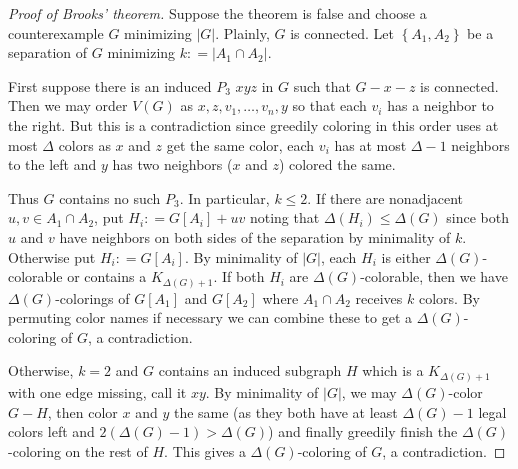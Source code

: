 \documentclass[12pt]{amsart}
\title{}
\theoremstyle{plain}
\theoremstyle{definition}
\theoremstyle{remark}
\newcommand{\set}[1]{\left\{ #1 \right\}}
\newcommand{\card}[1]{\left|#1\right|}
\newcommand{\DefinedAs}{\mathrel{\mathop:}=}
\begin{document}
\maketitle

\begin{proof}[Proof of Brooks' theorem]
Suppose the theorem is false and choose a counterexample $G$ minimizing $\card{G}$.  Plainly, $G$ is connected. Let $\set{A_1, A_2}$ be a separation of $G$ minimizing $k \DefinedAs \card{A_1 \cap A_2}$.  

First suppose there is an induced $P_3$ $xyz$ in $G$ such that $G - x - z$ is connected.  Then we may order $V(G)$ as $x, z, v_1, \ldots, v_n, y$ so that each $v_i$ has a neighbor to the right.  But this is a contradiction since greedily coloring in this order uses at most $\Delta$ colors as $x$ and $z$ get the same color, each $v_i$ has at most $\Delta - 1$ neighbors to the left and $y$ has two neighbors ($x$ and $z$) colored the same.

Thus $G$ contains no such $P_3$.  In particular, $k \leq 2$.  If there are nonadjacent $u, v \in A_1 \cap A_2$, put $H_i \DefinedAs G[A_i] + uv$ noting that $\Delta(H_i) \leq \Delta(G)$ since both $u$ and $v$ have neighbors on both sides of the separation by minimality of $k$.  Otherwise put $H_i \DefinedAs G[A_i]$.  By minimality of $\card{G}$, each $H_i$ is either $\Delta(G)$-colorable or contains a $K_{\Delta(G) + 1}$.  If both $H_i$ are $\Delta(G)$-colorable, then we have $\Delta(G)$-colorings of $G[A_1]$ and $G[A_2]$ where $A_1 \cap A_2$ receives $k$ colors.  By permuting color names if necessary we can combine these to get a $\Delta(G)$-coloring of $G$, a contradiction.

Otherwise, $k = 2$ and $G$ contains an induced subgraph $H$ which is a $K_{\Delta(G) + 1}$ with one edge missing, call it $xy$.  By minimality of $\card{G}$, we may $\Delta(G)$-color $G-H$, then color $x$ and $y$ the same (as they both have at least $\Delta(G) - 1$ legal colors left and $2(\Delta(G) - 1) > \Delta(G)$) and finally greedily finish the $\Delta(G)$-coloring on the rest of $H$.  This gives a $\Delta(G)$-coloring of $G$, a contradiction.
\end{proof}
\end{document}
